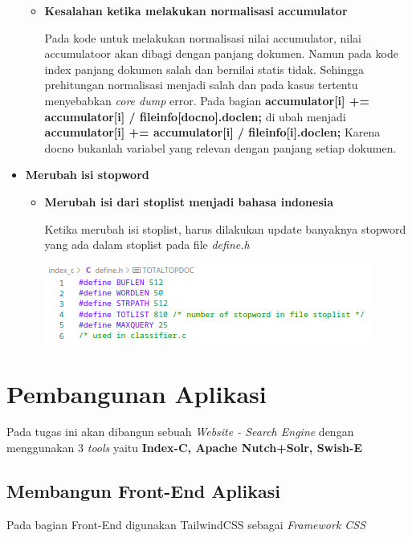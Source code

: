 \documentclass[12pt]{article}
\begin{document}
\begin{itemize}
\begin{itemize}
            \item \textbf{Kesalahan ketika melakukan normalisasi accumulator}
            \begin{flushleft}
                \justifying
                Pada kode untuk melakukan normalisasi nilai accumulator, nilai accumulatoor akan dibagi dengan panjang dokumen. Namun pada kode index panjang dokumen salah dan bernilai statis tidak. Sehingga prehitungan normalisasi menjadi salah dan pada kasus tertentu menyebabkan \textit{core dump} error.
                Pada bagian \textbf{accumulator[i] += accumulator[i] / fileinfo[docno].doclen;} di ubah menjadi \textbf{accumulator[i] += accumulator[i] / fileinfo[i].doclen;} Karena docno bukanlah variabel yang relevan dengan panjang setiap dokumen.
            \end{flushleft}
        \end{itemize}
        
        \item \textbf{Merubah isi stopword}
        \begin{itemize}
            \item \textbf{Merubah isi dari stoplist menjadi bahasa indonesia}
            \begin{flushleft}
                \justifying
                Ketika merubah isi stoplist, harus dilakukan update banyaknya stopword yang ada dalam stoplist pada file \textit{define.h}

                \includegraphics[scale=1.2]{images/sw.png}
            \end{flushleft}
        \end{itemize}
    \end{itemize}

    \section*{Pembangunan Aplikasi}
    Pada tugas ini akan dibangun sebuah \textit{Website - Search Engine} dengan menggunakan 3 \textit{tools} yaitu \textbf{Index-C, Apache Nutch+Solr, Swish-E} 

    \subsection*{Membangun Front-End Aplikasi}
    \justifying
    Pada bagian Front-End digunakan TailwindCSS sebagai \textit{Framework CSS}
\end{document}
